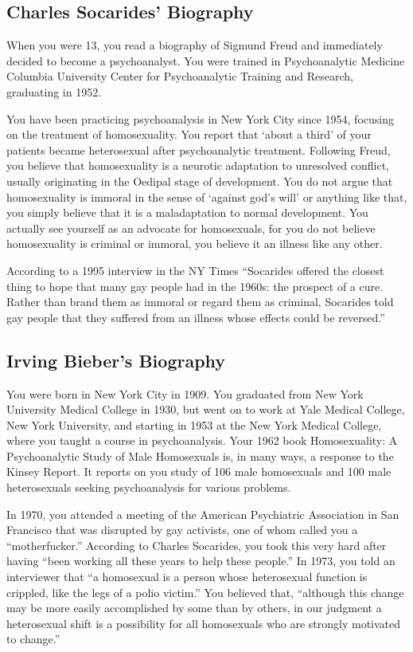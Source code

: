 \begin{refsection}
\subsection{Charles Socarides' Biography}
\label{charlessocaridesbiography}

When you were 13, you read a biography of Sigmund Freud and immediately decided to become a psychoanalyst. You were trained in Psychoanalytic Medicine Columbia University Center for Psychoanalytic Training and Research, graduating in 1952.

You have been practicing psychoanalysis in New York City since 1954, focusing on the treatment of homosexuality. You report that `about a third' of your patients became heterosexual after psychoanalytic treatment. Following Freud, you believe that homosexuality is a neurotic adaptation to unresolved conflict, usually originating in the Oedipal stage of development. You do not argue that homosexuality is immoral in the sense of `against god's will' or anything like that, you simply believe that it is a maladaptation to normal development. You actually see yourself as an advocate for homosexuals, for you do not believe homosexuality is criminal or immoral, you believe it an illness like any other.

According to a 1995 interview in the NY Times ``Socarides offered the closest thing to hope that many gay people had in the 1960s: the prospect of a cure. Rather than brand them as immoral or regard them as criminal, Socarides told gay people that they suffered from an illness whose effects could be reversed.''

\subsection{Irving Bieber's Biography}
\label{irvingbiebersbiography}

You were born in New York City in 1909. You graduated from New York University Medical College in 1930, but went on to work at Yale Medical College, New York University, and starting in 1953 at the New York Medical College, where you taught a course in psychoanalysis. Your 1962 book Homosexuality: A Psychoanalytic Study of Male Homosexuals is, in many ways, a response to the Kinsey Report. It reports on you study of 106 male homosexuals and 100 male heterosexuals seeking psychoanalysis for various problems.

In 1970, you attended a meeting of the American Psychiatric Association in San Francisco that was disrupted by gay activists, one of whom called you a ``motherfucker.'' According to Charles Socarides, you took this very hard after having ``been working all these years to help these people.'' In 1973, you told an interviewer that ``a homosexual is a person whose heterosexual function is crippled, like the legs of a polio victim.'' You believed that, ``although this change may be more easily accomplished by some than by others, in our judgment a heterosexual shift is a possibility for all homosexuals who are strongly motivated to change.''


\end{refsection}
